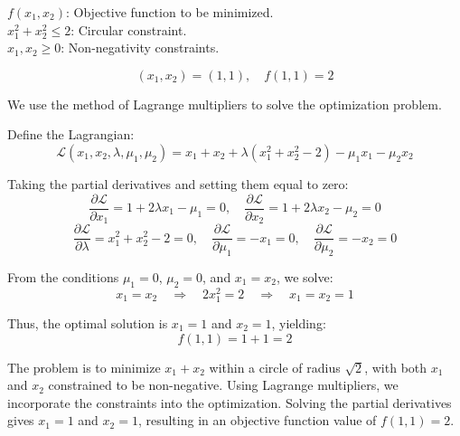 \textbf{$f(x_1, x_2)$}: Objective function to be minimized. \\
\textbf{$x_1^2 + x_2^2 \leq 2$}: Circular constraint. \\
\textbf{$x_1, x_2 \geq 0$}: Non-negativity constraints.

\[
(x_1, x_2) = (1, 1), \quad f(1, 1) = 2
\]

We use the method of Lagrange multipliers to solve the optimization problem.

Define the Lagrangian:
\[
\mathcal{L}(x_1, x_2, \lambda, \mu_1, \mu_2) = x_1 + x_2 + \lambda(x_1^2 + x_2^2 - 2) - \mu_1 x_1 - \mu_2 x_2
\]

Taking the partial derivatives and setting them equal to zero:
\[
\frac{\partial \mathcal{L}}{\partial x_1} = 1 + 2\lambda x_1 - \mu_1 = 0, \quad
\frac{\partial \mathcal{L}}{\partial x_2} = 1 + 2\lambda x_2 - \mu_2 = 0
\]
\[
\frac{\partial \mathcal{L}}{\partial \lambda} = x_1^2 + x_2^2 - 2 = 0, \quad
\frac{\partial \mathcal{L}}{\partial \mu_1} = -x_1 = 0, \quad
\frac{\partial \mathcal{L}}{\partial \mu_2} = -x_2 = 0
\]

From the conditions $\mu_1 = 0$, $\mu_2 = 0$, and $x_1 = x_2$, we solve:
\[
x_1 = x_2 \quad \Rightarrow \quad 2x_1^2 = 2 \quad \Rightarrow \quad x_1 = x_2 = 1
\]

Thus, the optimal solution is $x_1 = 1$ and $x_2 = 1$, yielding:
\[
f(1, 1) = 1 + 1 = 2
\]

The problem is to minimize $x_1 + x_2$ within a circle of radius $\sqrt{2}$, with both $x_1$ and $x_2$ constrained to be non-negative. Using Lagrange multipliers, we incorporate the constraints into the optimization. Solving the partial derivatives gives $x_1 = 1$ and $x_2 = 1$, resulting in an objective function value of $f(1, 1) = 2$.
